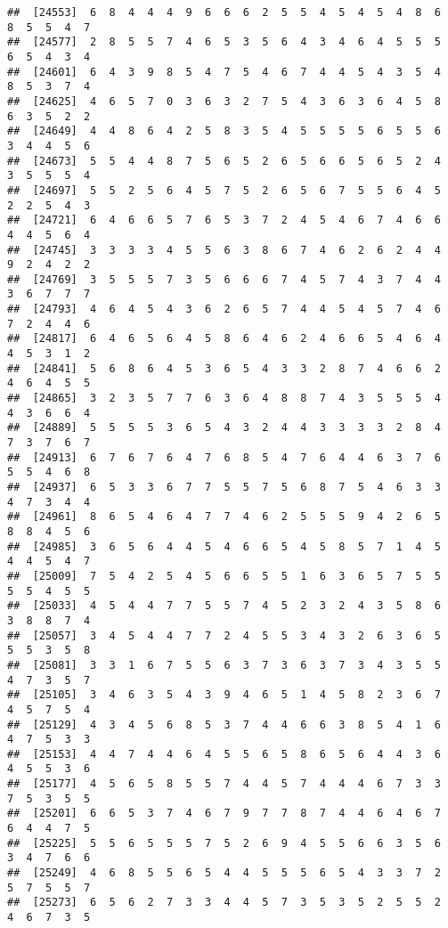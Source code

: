 \documentclass[
]{book}
\begin{document}
\begin{verbatim}
##  [24553]  6  8  4  4  4  9  6  6  6  2  5  5  4  5  4  5  4  8  6  8  5  5  4  7
##  [24577]  2  8  5  5  7  4  6  5  3  5  6  4  3  4  6  4  5  5  5  6  5  4  3  4
##  [24601]  6  4  3  9  8  5  4  7  5  4  6  7  4  4  5  4  3  5  4  8  5  3  7  4
##  [24625]  4  6  5  7  0  3  6  3  2  7  5  4  3  6  3  6  4  5  8  6  3  5  2  2
##  [24649]  4  4  8  6  4  2  5  8  3  5  4  5  5  5  5  6  5  5  6  3  4  4  5  6
##  [24673]  5  5  4  4  8  7  5  6  5  2  6  5  6  6  5  6  5  2  4  3  5  5  5  4
##  [24697]  5  5  2  5  6  4  5  7  5  2  6  5  6  7  5  5  6  4  5  2  2  5  4  3
##  [24721]  6  4  6  6  5  7  6  5  3  7  2  4  5  4  6  7  4  6  6  4  4  5  6  4
##  [24745]  3  3  3  3  4  5  5  6  3  8  6  7  4  6  2  6  2  4  4  9  2  4  2  2
##  [24769]  3  5  5  5  7  3  5  6  6  6  7  4  5  7  4  3  7  4  4  3  6  7  7  7
##  [24793]  4  6  4  5  4  3  6  2  6  5  7  4  4  5  4  5  7  4  6  7  2  4  4  6
##  [24817]  6  4  6  5  6  4  5  8  6  4  6  2  4  6  6  5  4  6  4  4  5  3  1  2
##  [24841]  5  6  8  6  4  5  3  6  5  4  3  3  2  8  7  4  6  6  2  4  6  4  5  5
##  [24865]  3  2  3  5  7  7  6  3  6  4  8  8  7  4  3  5  5  5  4  4  3  6  6  4
##  [24889]  5  5  5  5  3  6  5  4  3  2  4  4  3  3  3  3  2  8  4  7  3  7  6  7
##  [24913]  6  7  6  7  6  4  7  6  8  5  4  7  6  4  4  6  3  7  6  5  5  4  6  8
##  [24937]  6  5  3  3  6  7  7  5  5  7  5  6  8  7  5  4  6  3  3  4  7  3  4  4
##  [24961]  8  6  5  4  6  4  7  7  4  6  2  5  5  5  9  4  2  6  5  8  8  4  5  6
##  [24985]  3  6  5  6  4  4  5  4  6  6  5  4  5  8  5  7  1  4  5  4  4  5  4  7
##  [25009]  7  5  4  2  5  4  5  6  6  5  5  1  6  3  6  5  7  5  5  5  5  4  5  5
##  [25033]  4  5  4  4  7  7  5  5  7  4  5  2  3  2  4  3  5  8  6  3  8  8  7  4
##  [25057]  3  4  5  4  4  7  7  2  4  5  5  3  4  3  2  6  3  6  5  5  5  3  5  8
##  [25081]  3  3  1  6  7  5  5  6  3  7  3  6  3  7  3  4  3  5  5  4  7  3  5  7
##  [25105]  3  4  6  3  5  4  3  9  4  6  5  1  4  5  8  2  3  6  7  4  5  7  5  4
##  [25129]  4  3  4  5  6  8  5  3  7  4  4  6  6  3  8  5  4  1  6  4  7  5  3  3
##  [25153]  4  4  7  4  4  6  4  5  5  6  5  8  6  5  6  4  4  3  6  4  5  5  3  6
##  [25177]  4  5  6  5  8  5  5  7  4  4  5  7  4  4  4  6  7  3  3  7  5  3  5  5
##  [25201]  6  6  5  3  7  4  6  7  9  7  7  8  7  4  4  6  4  6  7  6  4  4  7  5
##  [25225]  5  5  6  5  5  5  7  5  2  6  9  4  5  5  6  6  3  5  6  3  4  7  6  6
##  [25249]  4  6  8  5  5  6  5  4  4  5  5  5  6  5  4  3  3  7  2  5  7  5  5  7
##  [25273]  6  5  6  2  7  3  3  4  4  5  7  3  5  3  5  2  5  5  2  4  6  7  3  5

\end{verbatim}
\end{document}
